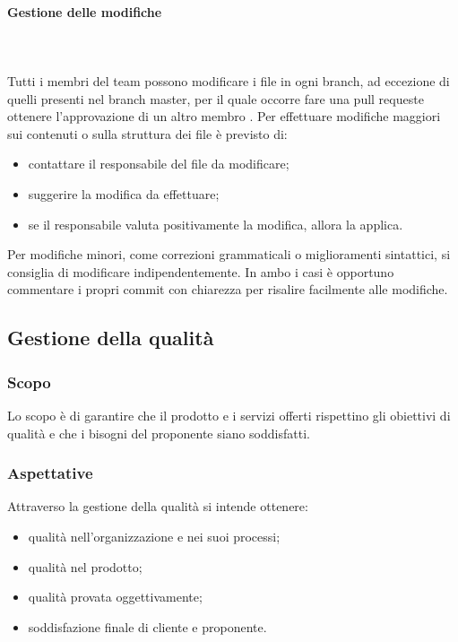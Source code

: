 	\paragraph{Gestione delle modifiche} \mbox{}\\ \mbox{}\\
	Tutti i membri del team possono modificare i file in ogni branch, ad eccezione di quelli presenti nel branch master, per il quale occorre fare una pull request\glosp e ottenere l'approvazione di un altro membro .\newline
	Per effettuare modifiche maggiori sui contenuti o sulla struttura dei file è previsto di:
	\begin{itemize}
		\item contattare il responsabile del file da modificare;
		\item suggerire la modifica da effettuare;
		\item se il responsabile valuta positivamente la modifica, allora la applica.
	\end{itemize}
	Per modifiche minori, come correzioni grammaticali o miglioramenti sintattici, si consiglia di modificare indipendentemente.\newline
	In ambo i casi è opportuno commentare i propri commit con chiarezza per risalire facilmente alle modifiche.

\subsection{Gestione della qualità}
	\subsubsection{Scopo}
	Lo scopo è di garantire che il prodotto e i servizi offerti rispettino gli obiettivi di qualità e che i bisogni del proponente siano soddisfatti.
	\subsubsection{Aspettative}
	Attraverso la gestione della qualità si intende ottenere:
	\begin{itemize}
		\item qualità nell'organizzazione e nei suoi processi;
		\item qualità nel prodotto;
		\item qualità provata oggettivamente;
		\item soddisfazione finale di cliente e proponente.
	\end{itemize}
